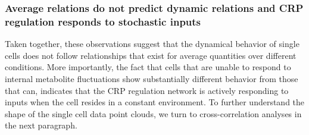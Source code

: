 \subsubsection{Average relations do not predict dynamic relations and CRP regulation responds to stochastic inputs}

Taken together, these observations suggest that the dynamical behavior of single cells
does not follow relationships that exist for average quantities over different conditions. 
More importantly, the fact that cells that are unable to respond to internal metabolite fluctuations show substantially different behavior from those that can, indicates that the CRP regulation network is actively responding to inputs when the cell resides in a constant environment.
%
To further understand the shape of the single cell data point clouds, we turn to cross-correlation analyses in the next paragraph.

